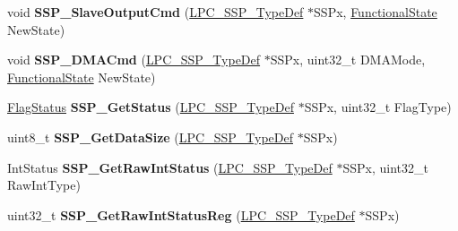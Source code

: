 \begin{DoxyCompactItemize}
\item 
\hypertarget{group___s_s_p___public___functions_gae371c17d5ddbd71d199224463445f767}{void {\bfseries \-S\-S\-P\-\_\-\-Slave\-Output\-Cmd} (\hyperlink{struct_l_p_c___s_s_p___type_def}{\-L\-P\-C\-\_\-\-S\-S\-P\-\_\-\-Type\-Def} $\ast$\-S\-S\-Px, \hyperlink{group___l_p_c___types___public___types_gac9a7e9a35d2513ec15c3b537aaa4fba1}{\-Functional\-State} \-New\-State)}\label{group___s_s_p___public___functions_gae371c17d5ddbd71d199224463445f767}

\item 
\hypertarget{group___s_s_p___public___functions_gac69f6e59bf67fdef7a38bdbaa8d3e8ae}{void {\bfseries \-S\-S\-P\-\_\-\-D\-M\-A\-Cmd} (\hyperlink{struct_l_p_c___s_s_p___type_def}{\-L\-P\-C\-\_\-\-S\-S\-P\-\_\-\-Type\-Def} $\ast$\-S\-S\-Px, uint32\-\_\-t \-D\-M\-A\-Mode, \hyperlink{group___l_p_c___types___public___types_gac9a7e9a35d2513ec15c3b537aaa4fba1}{\-Functional\-State} \-New\-State)}\label{group___s_s_p___public___functions_gac69f6e59bf67fdef7a38bdbaa8d3e8ae}

\item 
\hypertarget{group___s_s_p___public___functions_gac2aa0464f444c6e57bf09104aa05a135}{\hyperlink{group___l_p_c___types___public___types_ga89136caac2e14c55151f527ac02daaff}{\-Flag\-Status} {\bfseries \-S\-S\-P\-\_\-\-Get\-Status} (\hyperlink{struct_l_p_c___s_s_p___type_def}{\-L\-P\-C\-\_\-\-S\-S\-P\-\_\-\-Type\-Def} $\ast$\-S\-S\-Px, uint32\-\_\-t \-Flag\-Type)}\label{group___s_s_p___public___functions_gac2aa0464f444c6e57bf09104aa05a135}

\item 
\hypertarget{group___s_s_p___public___functions_ga4fc40b79a0bd2b6057803fe6ccd97ebb}{uint8\-\_\-t {\bfseries \-S\-S\-P\-\_\-\-Get\-Data\-Size} (\hyperlink{struct_l_p_c___s_s_p___type_def}{\-L\-P\-C\-\_\-\-S\-S\-P\-\_\-\-Type\-Def} $\ast$\-S\-S\-Px)}\label{group___s_s_p___public___functions_ga4fc40b79a0bd2b6057803fe6ccd97ebb}

\item 
\hypertarget{group___s_s_p___public___functions_gade02a6e43332586e8120f782b588dfdc}{\-Int\-Status {\bfseries \-S\-S\-P\-\_\-\-Get\-Raw\-Int\-Status} (\hyperlink{struct_l_p_c___s_s_p___type_def}{\-L\-P\-C\-\_\-\-S\-S\-P\-\_\-\-Type\-Def} $\ast$\-S\-S\-Px, uint32\-\_\-t \-Raw\-Int\-Type)}\label{group___s_s_p___public___functions_gade02a6e43332586e8120f782b588dfdc}

\item 
\hypertarget{group___s_s_p___public___functions_ga49e82b4a7010ad2de022399475e1f60b}{uint32\-\_\-t {\bfseries \-S\-S\-P\-\_\-\-Get\-Raw\-Int\-Status\-Reg} (\hyperlink{struct_l_p_c___s_s_p___type_def}{\-L\-P\-C\-\_\-\-S\-S\-P\-\_\-\-Type\-Def} $\ast$\-S\-S\-Px)}\label{group___s_s_p___public___functions_ga49e82b4a7010ad2de022399475e1f60b}


\end{DoxyCompactItemize}
